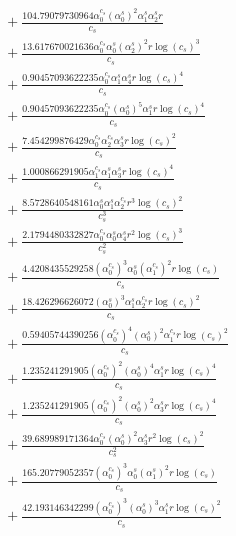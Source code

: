 \documentclass[10pt]{article}
\begin{document}
\begin{align*}
&{}  + \frac{104.79079730964 \alpha_{0}^{c_s} \left(\alpha_{0}^s\right)^{2} \alpha_{1}^s \alpha_{2}^s r}{c_{s}} \\
&{}  + \frac{13.617670021636 \alpha_{0}^{c_s} \alpha_{0}^s \left(\alpha_{2}^s\right)^{2} r \log{\left(c_{s} \right)}^{3}}{c_{s}} \\
&{}  + \frac{0.90457093622235 \alpha_{0}^{c_s} \alpha_{1}^s \alpha_{4}^s r \log{\left(c_{s} \right)}^{4}}{c_{s}} \\
&{}  + \frac{0.90457093622235 \alpha_{0}^{c_s} \left(\alpha_{0}^s\right)^{5} \alpha_{1}^s r \log{\left(c_{s} \right)}^{4}}{c_{s}} \\
&{}  + \frac{7.454299876429 \alpha_{0}^{c_s} \alpha_{2}^{c_s} \alpha_{3}^s r \log{\left(c_{s} \right)}^{2}}{c_{s}} \\
&{}  + \frac{1.000866291905 \alpha_{1}^{c_s} \alpha_{1}^s \alpha_{3}^s r \log{\left(c_{s} \right)}^{4}}{c_{s}} \\
&{}  + \frac{8.5728640548161 \alpha_{0}^s \alpha_{1}^s \alpha_{2}^{c_s} r^{3} \log{\left(c_{s} \right)}^{2}}{c_{s}^{3}} \\
&{}  + \frac{2.1794480332827 \alpha_{0}^{c_s} \alpha_{0}^s \alpha_{4}^s r^{2} \log{\left(c_{s} \right)}^{3}}{c_{s}^{2}} \\
&{}  + \frac{4.4208435529258 \left(\alpha_{0}^{c_s}\right)^{3} \alpha_{0}^s \left(\alpha_{1}^{c_s}\right)^{2} r \log{\left(c_{s} \right)}}{c_{s}} \\
&{}  + \frac{18.426296626072 \left(\alpha_{0}^s\right)^{3} \alpha_{1}^s \alpha_{2}^{c_s} r \log{\left(c_{s} \right)}^{2}}{c_{s}} \\
&{}  + \frac{0.59405744390256 \left(\alpha_{0}^{c_s}\right)^{4} \left(\alpha_{0}^s\right)^{2} \alpha_{1}^{c_s} r \log{\left(c_{s} \right)}^{2}}{c_{s}} \\
&{}  + \frac{1.235241291905 \left(\alpha_{0}^{c_s}\right)^{2} \left(\alpha_{0}^s\right)^{4} \alpha_{1}^s r \log{\left(c_{s} \right)}^{4}}{c_{s}} \\
&{}  + \frac{1.235241291905 \left(\alpha_{0}^{c_s}\right)^{2} \left(\alpha_{0}^s\right)^{2} \alpha_{3}^s r \log{\left(c_{s} \right)}^{4}}{c_{s}} \\
&{}  + \frac{39.689989171364 \alpha_{0}^{c_s} \left(\alpha_{0}^s\right)^{2} \alpha_{3}^s r^{2} \log{\left(c_{s} \right)}^{2}}{c_{s}^{2}} \\
&{}  + \frac{165.20779052357 \left(\alpha_{0}^{c_s}\right)^{3} \alpha_{0}^s \left(\alpha_{1}^s\right)^{2} r \log{\left(c_{s} \right)}}{c_{s}} \\
&{}  + \frac{42.193146342299 \left(\alpha_{0}^{c_s}\right)^{3} \left(\alpha_{0}^s\right)^{3} \alpha_{1}^s r \log{\left(c_{s} \right)}^{2}}{c_{s}} \\

\end{align*}
\end{document}
